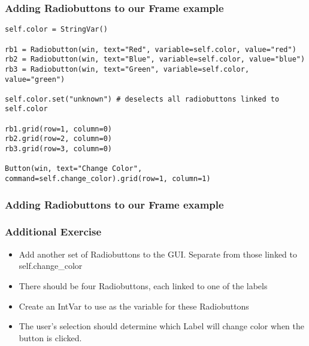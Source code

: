 \begin{frame}[fragile] \frametitle{Adding Radiobuttons to our Frame example}
\begin{lstlisting}
self.color = StringVar()

rb1 = Radiobutton(win, text="Red", variable=self.color, value="red")
rb2 = Radiobutton(win, text="Blue", variable=self.color, value="blue")
rb3 = Radiobutton(win, text="Green", variable=self.color, value="green")

self.color.set("unknown") # deselects all radiobuttons linked to self.color

rb1.grid(row=1, column=0)
rb2.grid(row=2, column=0)
rb3.grid(row=3, column=0)

Button(win, text="Change Color", command=self.change_color).grid(row=1, column=1)
\end{lstlisting}
\end{frame}

\begin{frame}[fragile] \frametitle{Adding Radiobuttons to our Frame example}

\hfill
{}
\end{frame}

\begin{frame}[fragile] \frametitle{Additional Exercise}
\begin{itemize}
\item Add another set of Radiobuttons to the GUI. Separate from those linked to self.change\_color
\item There should be four Radiobuttons, each linked to one of the labels
\item Create an IntVar to use as the variable for these Radiobuttons
\item The user's selection should determine which Label will change color when the button is clicked.
\end{itemize}
\end{frame}

